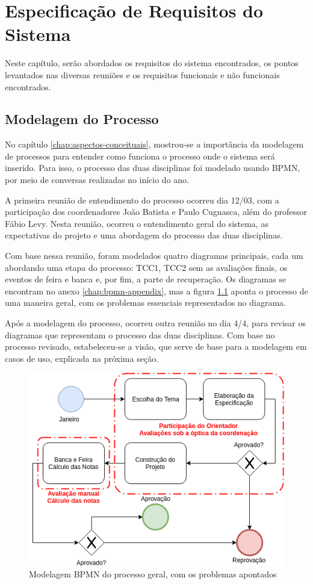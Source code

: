 \chapter{Especificação de Requisitos do Sistema}\label{chap:especificacao-requisitos-sistema}
Neste capítulo, serão abordados os requisitos do sistema encontrados, os pontos levantados nas diversas reuniões e os requisitos funcionais e não funcionais encontrados.

\section{Modelagem do Processo}
No capítulo \ref{chap:aspectos-conceituais}, mostrou-se a importância da modelagem de processos para entender como funciona o processo onde o sistema será inserido. Para isso, o processo das duas disciplinas foi modelado usando BPMN, por meio de conversas realizadas no início do ano.

A primeira reunião de entendimento do processo ocorreu dia 12/03, com a participação dos coordenadores João Batista e Paulo Cugnasca, além do professor Fábio Levy. Nesta reunião, ocorreu o entendimento geral do sistema, as expectativas do projeto e uma abordagem do processo das duas disciplinas.

Com base nessa reunião, foram modelados quatro diagramas principais, cada um abordando uma etapa do processo: TCC1, TCC2 sem as avaliações finais, os eventos de feira e banca e, por fim, a parte de recuperação. Os diagramas se encontram no anexo \ref{chap:bpmn-appendix}, mas a figura \ref{fig:bpmn-geral} aponta o processo de uma maneira geral, com os problemas essenciais representados no diagrama.

Após a modelagem do processo, ocorreu outra reunião no dia 4/4, para revisar os diagramas que representam o processo das duas disciplinas. Com base no processo revisado, estabeleceu-se a visão, que serve de base para a modelagem em casos de uso, explicada na próxima seção.

\begin{figure}[!htpb]
    \centering
    \includegraphics[scale=0.6]{imagens/bpmn_geral.png}
    \caption{Modelagem BPMN do processo geral, com os problemas apontados}
    \label{fig:bpmn-geral}
\end{figure}

